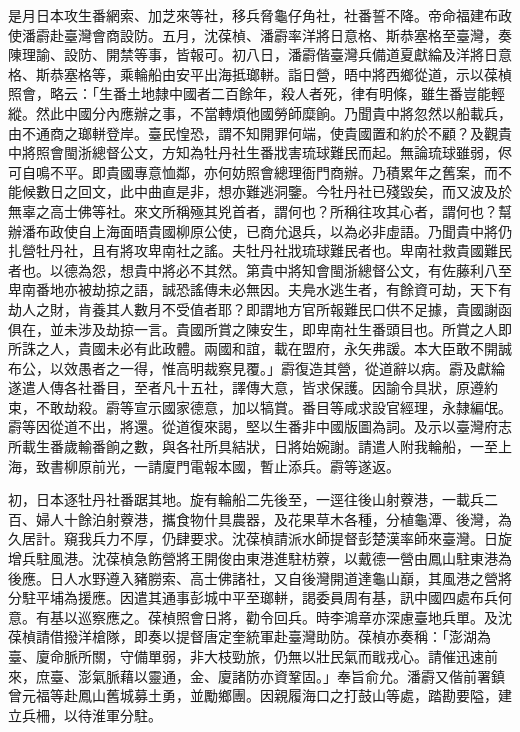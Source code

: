 \begin{pinyinscope}
是月日本攻生番網索、加芝來等社，移兵脅龜仔角社，社番誓不降。帝命福建布政使潘霨赴臺灣會商設防。五月，沈葆楨、潘霨率洋將日意格、斯恭塞格至臺灣，奏陳理諭、設防、開禁等事，皆報可。初八日，潘霨偕臺灣兵備道夏獻綸及洋將日意格、斯恭塞格等，乘輪船由安平出海抵瑯軿。詣日營，晤中將西鄉從道，示以葆楨照會，略云：「生番土地隸中國者二百餘年，殺人者死，律有明條，雖生番豈能輕縱。然此中國分內應辦之事，不當轉煩他國勞師糜餉。乃聞貴中將忽然以船載兵，由不通商之瑯軿登岸。臺民惶恐，謂不知開罪何端，使貴國置和約於不顧？及觀貴中將照會閩浙總督公文，方知為牡丹社生番戕害琉球難民而起。無論琉球雖弱，侭可自鳴不平。即貴國專意恤鄰，亦何妨照會總理衙門商辦。乃積累年之舊案，而不能候數日之回文，此中曲直是非，想亦難逃洞鑒。今牡丹社已殘毀矣，而又波及於無辜之高士佛等社。來文所稱殛其兇首者，謂何也？所稱往攻其心者，謂何也？幫辦潘布政使自上海面晤貴國柳原公使，已商允退兵，以為必非虛語。乃聞貴中將仍扎營牡丹社，且有將攻卑南社之謠。夫牡丹社戕琉球難民者也。卑南社救貴國難民者也。以德為怨，想貴中將必不其然。第貴中將知會閩浙總督公文，有佐藤利八至卑南番地亦被劫掠之語，誠恐謠傳未必無因。夫鳧水逃生者，有餘資可劫，天下有劫人之財，肯養其人數月不受值者耶？即謂地方官所報難民口供不足據，貴國謝函俱在，並未涉及劫掠一言。貴國所賞之陳安生，即卑南社生番頭目也。所賞之人即所誅之人，貴國未必有此政體。兩國和誼，載在盟府，永矢弗諼。本大臣敢不開誠布公，以效愚者之一得，惟高明裁察見覆。」霨復造其營，從道辭以病。霨及獻綸遂遣人傳各社番目，至者凡十五社，譯傳大意，皆求保護。因諭令具狀，原遵約束，不敢劫殺。霨等宣示國家德意，加以犒賞。番目等咸求設官經理，永隸編氓。霨等因從道不出，將還。從道復來謁，堅以生番非中國版圖為詞。及示以臺灣府志所載生番歲輸番餉之數，與各社所具結狀，日將始婉謝。請遣人附我輪船，一至上海，致書柳原前光，一請廈門電報本國，暫止添兵。霨等遂返。

初，日本逐牡丹社番踞其地。旋有輪船二先後至，一逕往後山射藔港，一載兵二百、婦人十餘泊射藔港，攜食物什具農器，及花果草木各種，分植龜潭、後灣，為久居計。窺我兵力不厚，仍肆要求。沈葆楨請派水師提督彭楚漢率師來臺灣。日旋增兵駐風港。沈葆楨急飭營將王開俊由東港進駐枋藔，以戴德一營由鳳山駐東港為後應。日人水野遵入豬朥索、高士佛諸社，又自後灣開道達龜山巔，其風港之營將分駐平埔為援應。因遣其通事彭城中平至瑯軿，謁委員周有基，訊中國四處布兵何意。有基以巡察應之。葆楨照會日將，勸令回兵。時李鴻章亦深慮臺地兵單。及沈葆楨請借撥洋槍隊，即奏以提督唐定奎統軍赴臺灣助防。葆楨亦奏稱：「澎湖為臺、廈命脈所關，守備單弱，非大枝勁旅，仍無以壯民氣而戢戎心。請催迅速前來，庶臺、澎氣脈藉以靈通，金、廈諸防亦資鞏固。」奉旨俞允。潘霨又偕前署鎮曾元福等赴鳳山舊城募土勇，並勵鄉團。因親履海口之打鼓山等處，踏勘要隘，建立兵柵，以待淮軍分駐。


\end{pinyinscope}

